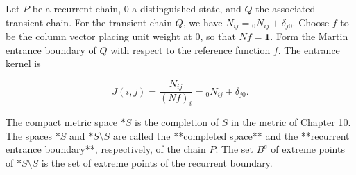 Let $P$ be a recurrent chain, $0$ a distinguished state, and $Q$ the associated transient chain. For the transient chain $Q$, we have $N_{ij} = {}_0 N_{ij} + \delta_{j0}$. Choose $f$ to be the column vector placing unit weight at $0$, so that $Nf = \mathbf{1}$. Form the Martin entrance boundary of $Q$ with respect to the reference function $f$. The entrance kernel is

$$J(i,j) = \frac{N_{ij}}{(Nf)_i} = {}_0 N_{ij} + \delta_{j0}.$$

The compact metric space $*S$ is the completion of $S$ in the metric of Chapter 10. The spaces $*S$ and $*S \setminus S$ are called the **completed space** and the **recurrent entrance boundary**, respectively, of the chain $P$. The set $B^e$ of extreme points of $*S \setminus S$ is the set of extreme points of the recurrent boundary.
